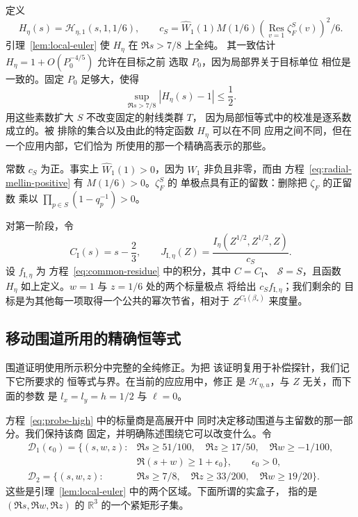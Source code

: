 \documentclass[11pt,a4paper]{article}
\numberwithin{equation}{section}
\numberwithin{figure}{section}
\theoremstyle{definition}
\theoremstyle{remark}
\begin{document}
定义
\begin{equation}
 H_\eta(s)=\mathcal H_{\eta,1}(s,1,1/6),\qquad
 c_S=\widehat W_1(1)M(1/6)
       \left(\operatorname*{Res}_{v=1}\zeta_F^S(v)\right)^2/6.
 \label{eq:shared-principal-data}
\end{equation}
引理~\ref{lem:local-euler} 使 $H_\eta$ 在 $\Re s>7/8$ 上全纯。
其一致估计 $H_\eta=1+O(P_0^{-4/5})$ 允许在目标之前
选取 $P_0$，因为局部界关于目标单位
相位是一致的。固定 $P_0$ 足够大，使得
\begin{equation}
 \sup_{\Re s>7/8}|H_\eta(s)-1|\le\frac12.
 \label{eq:shared-principal-nonvanishing}
\end{equation}
用这些素数扩大 $S$ 不改变固定的射线类群 $T$，
因为局部恒等式中的校准是逐系数成立的。被
排除的集合以及由此的特定函数 $H_\eta$ 可以在不同
应用之间不同，但在一个应用内部，它们恰为
所使用的那一个精确高表示的那些。

常数 $c_S$ 为正。事实上 $\widehat W_1(1)>0$，因为
$W_1$ 非负且非零，而由
方程~\eqref{eq:radial-mellin-positive} 有 $M(1/6)>0$。$\zeta_F^S$ 的
单极点具有正的留数：删除把 $\zeta_F$ 的正留数
乘以 $\prod_{p\in S}(1-q_p^{-1})>0$。

对第一阶段，令
\[
 C_{\mathrm I}(s)=s-\frac23,\qquad
 J_{\mathrm I,\eta}(Z)=\frac{I_\eta(Z^{1/2},Z^{1/2},Z)}{c_S}.
\]
设 $f_{\mathrm I,\eta}$ 为
方程~\eqref{eq:common-residue} 中的积分，其中 $C=C_{\mathrm I}$、
$\mathcal S=S$，且函数 $H_\eta$ 如上定义。$w=1$ 与 $z=1/6$ 处的两个标量极点
将给出 $c_S f_{\mathrm I,\eta}$；我们剩余的
目标是为其他每一项取得一个公共的幂次节省，相对于
$Z^{C_{\mathrm I}(\beta_*)}$ 来度量。

\subsection{移动围道所用的精确恒等式}

围道证明使用所示积分中完整的全纯修正。为把
该证明复用于补偿探针，我们记下它所要求的
恒等式与界。在当前的应应用中，修正
是 $\mathcal H_{\eta,u}$，与 $Z$ 无关，而下面的参数
是 $l_x=l_y=h=1/2$ 与 $\ell=0$。

方程~\eqref{eq:probe-high} 中的标量商是高展开中
同时决定移动围道与主留数的那一部分。我们保持该商
固定，并明确陈述围绕它可以改变什么。令
\[
 \begin{split}
 \mathcal D_1(\epsilon_0)=\{(s,w,z):{}&\Re s\ge51/100,\quad
       \Re z\ge17/50,\quad \Re w\ge-1/100,\\
       &\Re(s+w)\ge1+\epsilon_0\},\qquad \epsilon_0>0,\\
 \mathcal D_2=\{(s,w,z):{}&\Re s\ge7/8,\quad
       \Re z\ge33/200,\quad \Re w\ge19/20\}.
 \end{split}
\]
这些是引理~\ref{lem:local-euler} 中的两个区域。下面所谓的实盒子，
指的是 $(\Re s,\Re w,\Re z)$ 的 $\mathbb R^3$ 的一个紧矩形子集。
\end{document}
